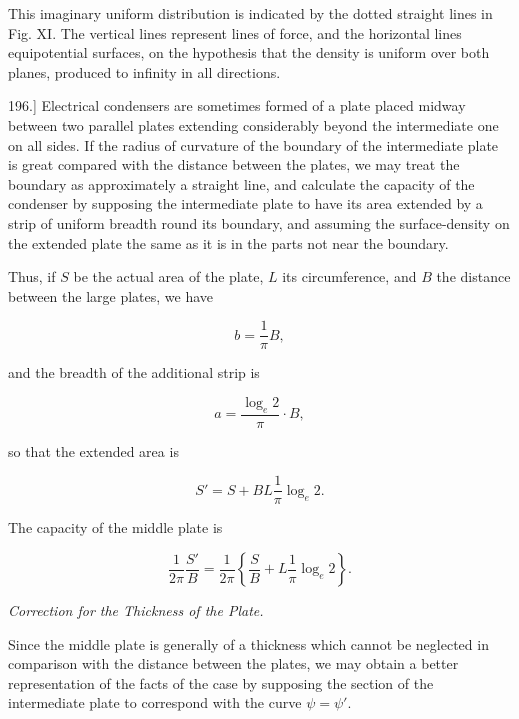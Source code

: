 \documentclass[11pt,a4paper]{article}
\begin{document}
This imaginary uniform distribution is indicated by the dotted straight
lines in Fig. XI. The vertical lines represent lines of force, and the
horizontal lines equipotential surfaces, on the hypothesis that the
density is uniform over both planes, produced to infinity in all
directions.

196.] Electrical condensers are sometimes formed of a plate placed
midway between two parallel plates extending considerably beyond the
intermediate one on all sides. If the radius of curvature of the
boundary of the intermediate plate is great compared with the distance
between the plates, we may treat the boundary as approximately a
straight line, and calculate the capacity of the condenser by supposing
the intermediate plate to have its area extended by a strip of uniform
breadth round its boundary, and assuming the surface-density on the
extended plate the same as it is in the parts not near the boundary.

Thus, if $S$ be the actual area of the plate, $L$ its circumference,
and $B$ the distance between the large plates, we have

\begin{equation}\tag{13}
b = \frac{1}{\pi}B,
\end{equation}

and the breadth of the additional strip is

\begin{equation}\tag{14}
a = \frac{\log_e 2}{\pi} \cdot B,
\end{equation}

so that the extended area is

\begin{equation}\tag{15}
S'=S+BL\frac{1}{\pi}\log_e 2.
\end{equation}

The capacity of the middle plate is

\begin{equation}\tag{16}
\frac{1}{2\pi} \frac{S'}{B} = \frac{1}{2\pi} \left\{ \frac{S}{B} + L \frac{1}{\pi} \log_e 2 \right\}.
\end{equation}

\begin{center}
\textit{Correction for the Thickness of the Plate.}
\end{center}

Since the middle plate is generally of a thickness which cannot be
neglected in comparison with the distance between the plates, we may
obtain a better representation of the facts of the case by supposing
the section of the intermediate plate to correspond with the curve
$\psi=\psi'$.
\end{document}
